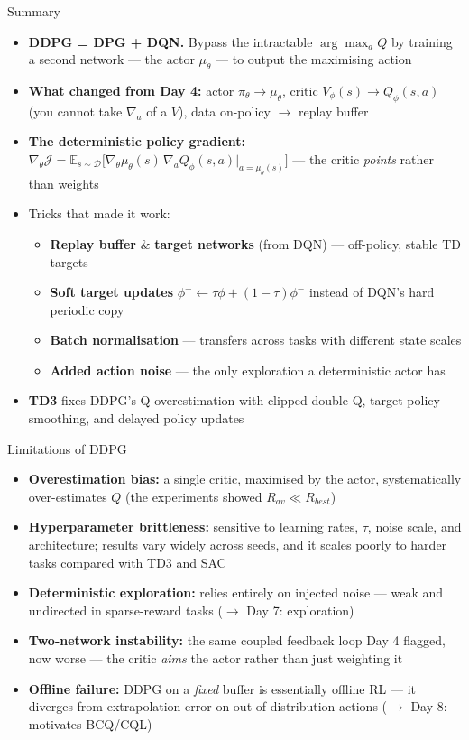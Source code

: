 \begin{frame}{Summary}
\begin{itemize}
    \item \textbf{DDPG = DPG + DQN.} Bypass the intractable $\arg\max_a Q$ by training a second network --- the actor $\mu_\theta$ --- to output the maximising action
    \item \textbf{What changed from Day 4:} actor $\pi_\theta \to \mu_\theta$, critic $V_\phi(s) \to Q_\phi(s,a)$ (you cannot take $\nabla_a$ of a $V$), data on-policy $\to$ replay buffer
    \item \textbf{The deterministic policy gradient:}
    $\nabla_\theta \mathcal{J} = \mathbb{E}_{s \sim \mathcal{D}}\big[\nabla_\theta \mu_\theta(s)\, \nabla_a Q_\phi(s,a)|_{a=\mu_\theta(s)}\big]$ --- the critic \emph{points} rather than weights
    \item Tricks that made it work:
    \begin{itemize}
        \item \textbf{Replay buffer} \& \textbf{target networks} (from DQN) --- off-policy, stable TD targets
        \item \textbf{Soft target updates} $\phi^{-} \leftarrow \tau\phi + (1-\tau)\phi^{-}$ instead of DQN's hard periodic copy
        \item \textbf{Batch normalisation} --- transfers across tasks with different state scales
        \item \textbf{Added action noise} --- the only exploration a deterministic actor has
    \end{itemize}
    \item \textbf{TD3} fixes DDPG's Q-overestimation with clipped double-Q, target-policy smoothing, and delayed policy updates
\end{itemize}
\end{frame}

\begin{frame}{Limitations of DDPG}
\begin{itemize}
    \item \textbf{Overestimation bias:} a single critic, maximised by the actor, systematically over-estimates $Q$ (the experiments showed $R_{av} \ll R_{best}$)
    \item \textbf{Hyperparameter brittleness:} sensitive to learning rates, $\tau$, noise scale, and architecture; results vary widely across seeds, and it scales poorly to harder tasks compared with TD3 and SAC
    \item \textbf{Deterministic exploration:} relies entirely on injected noise --- weak and undirected in sparse-reward tasks ($\rightarrow$ Day 7: exploration)
    \item \textbf{Two-network instability:} the same coupled feedback loop Day 4 flagged, now worse --- the critic \emph{aims} the actor rather than just weighting it
    \item \textbf{Offline failure:} DDPG on a \emph{fixed} buffer is essentially offline RL --- it diverges from extrapolation error on out-of-distribution actions ($\rightarrow$ Day 8: motivates BCQ/CQL)
\end{itemize}
\end{frame}
